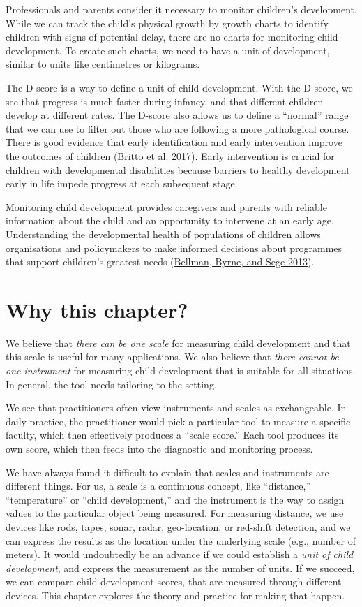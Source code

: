 \documentclass[
]{book}
\begin{document}
Professionals and parents consider it necessary to monitor children's development. While we can track the child's physical growth by growth charts to identify children with signs of potential delay, there are no charts for monitoring child development. To create such charts, we need to have a unit of development, similar to units like centimetres or kilograms.

The D-score is a way to define a unit of child development. With the D-score, we see that progress is much faster during infancy, and that different children develop at different rates. The D-score also allows us to define a ``normal'' range that we can use to filter out those who are following a more pathological course. There is good evidence that early identification and early intervention improve the outcomes of children (\protect\hyperlink{ref-britto2017}{Britto et al. 2017}). Early intervention is crucial for children with developmental disabilities because barriers to healthy development early in life impede progress at each subsequent stage.

Monitoring child development provides caregivers and parents with reliable information about the child and an opportunity to intervene at an early age. Understanding the developmental health of populations of children allows organisations and policymakers to make informed decisions about programmes that support children's greatest needs (\protect\hyperlink{ref-bellman2013}{Bellman, Byrne, and Sege 2013}).

\hypertarget{sec:why}{%
\section{Why this chapter?}\label{sec:why}}

We believe that \emph{there can be one scale} for measuring child development and that this scale is useful for many applications. We also believe that \emph{there cannot be one instrument} for measuring child development that is suitable for all situations. In general, the tool needs tailoring to the setting.

We see that practitioners often view instruments and scales as exchangeable. In daily practice, the practitioner would pick a particular tool to measure a specific faculty, which then effectively produces a ``scale score.'' Each tool produces its own score, which then feeds into the diagnostic and monitoring process.

We have always found it difficult to explain that scales and instruments are different things. For us, a scale is a continuous concept, like ``distance,'' ``temperature'' or ``child development,'' and the instrument is the way to assign values to the particular object being measured. For measuring distance, we use devices like rods, tapes, sonar, radar, geo-location, or red-shift detection, and we can express the results as the location under the underlying scale (e.g., number of meters). It would undoubtedly be an advance if we could establish a \emph{unit of child development}, and express the measurement as the number of units. If we succeed, we can compare child development scores, that are measured through different devices. This chapter explores the theory and practice for making that happen.
\end{document}
